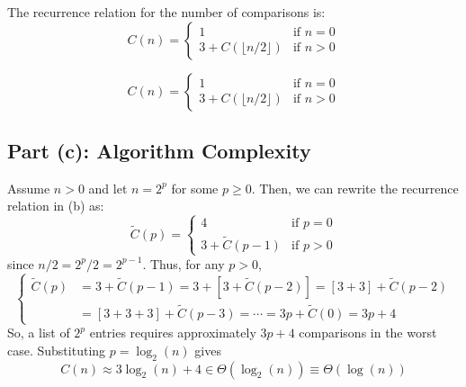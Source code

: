 \documentclass{article}
\begin{document}
The recurrence relation for the number of comparisons is:
\[
C(n) = 
\begin{cases} 
1 & \text{if } n = 0 \\
3 + C(\lfloor n/2 \rfloor) & \text{if } n > 0 
\end{cases}
\]

\[
\boxed{C(n) = 
\begin{cases} 
1 & \text{if } n = 0 \\
3 + C(\lfloor n/2 \rfloor) & \text{if } n > 0 
\end{cases}}
\]

\subsection*{Part (c): Algorithm Complexity}

Assume $n>0$ and  let $n = 2^p$ for some $p\geq 0$. Then, we can rewrite the recurrence relation in (b) as:
\[
\tilde{C}(p) = 
\begin{cases} 
4 & \text{if } p = 0 \\
3 + \tilde{C}(p-1)  & \text{if } p > 0 
\end{cases}
\]
since $n/2 = 2^p/2 = 2^{p-1}$. Thus, for any $p>0$,
\[
\begin{cases}
  \tilde{C}(p) & = 3 + \tilde{C}(p-1) = 3 + [ 3+\tilde{C}(p-2) ] = [3+3]+\tilde{C}(p-2)\\
      & = [3+3+3]+\tilde{C}(p-3) = \cdots = 3p+\tilde{C}(0) = 3p+4
 \end{cases}
 \]
 So, a list of $2^p$ entries requires approximately $3p+4$ comparisons
   in the worst case. Substituting $p=\log_2(n)$ gives 
   \[ C(n) \approx 3\log_2(n)+4 \in \Theta(\log_2(n)) \equiv \Theta(\log (n)) 
   \]
\end{document}
